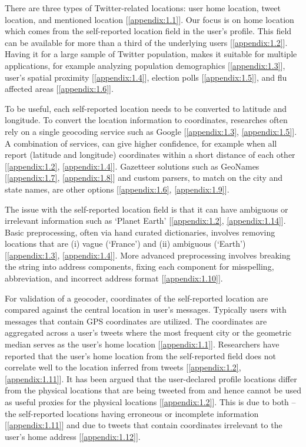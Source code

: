 There are three types of Twitter-related locations: user home location, tweet location, and mentioned location [\ref{appendix:1.1}]. Our focus is on home location which comes from the self-reported location field in the user's profile. This field can be available for more than a third of the underlying users [\ref{appendix:1.2}]. Having it for a large sample of Twitter population, makes it suitable for multiple applications, for example analyzing population demographics [\ref{appendix:1.3}], user's spatial proximity [\ref{appendix:1.4}], election polls [\ref{appendix:1.5}], and flu affected areas [\ref{appendix:1.6}].

To be useful, each self-reported location needs to be converted to latitude and longitude. To convert the location information to coordinates, researches often rely on a single geocoding service such as Google [\ref{appendix:1.3}, \ref{appendix:1.5}]. A combination of services, can give higher confidence, for example when all report (latitude and longitude) coordinates within a short distance of each other [\ref{appendix:1.2}, \ref{appendix:1.4}]. Gazetteer solutions such as GeoNames [\ref{appendix:1.7}, \ref{appendix:1.8}] and custom parsers, to match on the city and state names, are other options [\ref{appendix:1.6}, \ref{appendix:1.9}]. 

The issue with the self-reported location field is that it can have ambiguous or irrelevant information such as `Planet Earth' [\ref{appendix:1.2}, \ref{appendix:1.14}]. Basic preprocessing, often via hand curated dictionaries, involves removing locations that are (i) vague (`France') and (ii) ambiguous (`Earth') [\ref{appendix:1.3}, \ref{appendix:1.4}]. More advanced preprocessing involves breaking the string into address components, fixing each component for misspelling, abbreviation, and incorrect address format [\ref{appendix:1.10}]. 

For validation of a geocoder, coordinates of the self-reported location are compared against the central location in user's messages. Typically users with messages that contain GPS coordinates are utilized. The coordinates are aggregated across a user's tweets where the most frequent city or the geometric median serves as the user's home location [\ref{appendix:1.1}]. Researchers have reported that the user's home location from the self-reported field does not correlate well to the location inferred from tweets [\ref{appendix:1.2}, \ref{appendix:1.11}]. It has been argued that the user-declared profile locations differ from the physical locations that are being tweeted from and hence cannot be used as useful proxies for the physical locations [\ref{appendix:1.2}]. This is due to both -- the self-reported locations having erroneous or incomplete information [\ref{appendix:1.11}] and due to tweets that contain coordinates irrelevant to the user's home address [\ref{appendix:1.12}].

